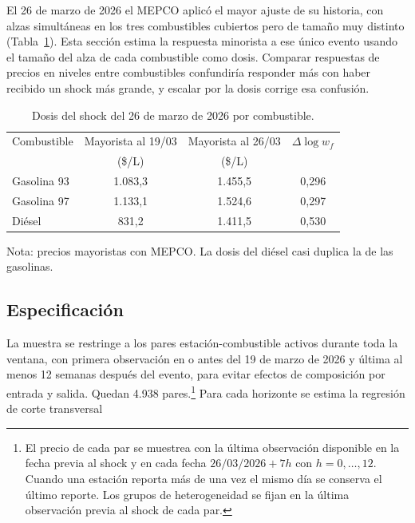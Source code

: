 \documentclass[11pt]{article}
\begin{document}
El 26 de marzo de 2026 el MEPCO aplicó el mayor ajuste de su historia, con
alzas simultáneas en los tres combustibles cubiertos pero de tamaño muy
distinto (Tabla~\ref{tab:dosis}). Esta sección estima la respuesta minorista
a ese único evento usando el tamaño del alza de cada combustible como dosis.
Comparar respuestas de precios en niveles entre combustibles confundiría
responder más con haber recibido un shock más grande, y escalar por la dosis
corrige esa confusión.

\begin{table}[htbp]
\centering
\caption{Dosis del shock del 26 de marzo de 2026 por combustible.}
\label{tab:dosis}
\begin{tabular}{lccc}
\toprule
Combustible & Mayorista al 19/03 & Mayorista al 26/03 & $\Delta \log w_f$ \\
 & (\$/L) & (\$/L) & \\
\midrule
Gasolina 93 & 1.083,3 & 1.455,5 & 0,296 \\
Gasolina 97 & 1.133,1 & 1.524,6 & 0,297 \\
Diésel      & 831,2   & 1.411,5 & 0,530 \\
\bottomrule
\end{tabular}

\medskip
\begin{minipage}{0.8\textwidth}
\footnotesize
Nota: precios mayoristas con MEPCO. La dosis del diésel casi duplica la de
las gasolinas.
\end{minipage}
\end{table}

\subsection{Especificación}
\label{sec:lp_evento_especificacion}

La muestra se restringe a los pares estación-combustible activos durante
toda la ventana, con primera observación en o antes del 19 de marzo de 2026
y última al menos 12 semanas después del evento, para evitar efectos de
composición por entrada y salida. Quedan 4.938 pares.\footnote{El precio de
cada par se muestrea con la última observación disponible en la fecha previa
al shock y en cada fecha $26/03/2026 + 7h$ con $h = 0, \dots, 12$. Cuando
una estación reporta más de una vez el mismo día se conserva el último
reporte. Los grupos de heterogeneidad se fijan en la última observación
previa al shock de cada par.} Para cada horizonte se estima la regresión de
corte transversal
\end{document}
